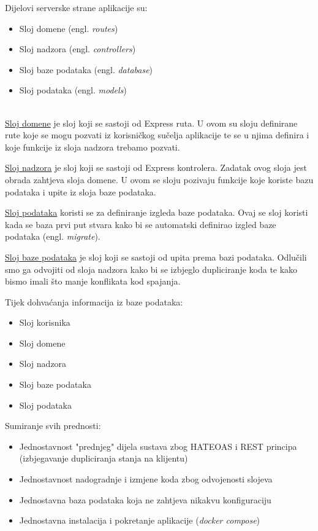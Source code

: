 Dijelovi serverske strane aplikacije su:
\begin{itemize}
  \item Sloj domene (engl. \textit{routes})
  \item Sloj nadzora (engl. \textit{controllers})
  \item Sloj baze podataka (engl. \textit{database})
  \item Sloj podataka (engl. \textit{models})
\end{itemize}
\hfill
\\

\underline{Sloj domene} je sloj koji se sastoji od Express ruta. U ovom su sloju definirane rute koje se mogu pozvati iz korisničkog sučelja aplikacije te se u njima definira i koje funkcije iz sloja nadzora trebamo pozvati.\hfill \break

\underline{Sloj nadzora} je sloj koji se sastoji od Express kontrolera. Zadatak  ovog sloja jest obrada zahtjeva sloja domene. U ovom se sloju pozivaju funkcije koje koriste bazu podataka i upite iz sloja baze podataka.\hfill \break

\underline{Sloj podataka} koristi se za definiranje izgleda baze podataka. Ovaj se sloj koristi kada se baza prvi put stvara kako bi se automatski definirao izgled baze podataka (engl. \textit{migrate}).\hfill \break

\underline{Sloj baze podataka} je sloj koji se sastoji od upita prema bazi podataka. Odlučili smo ga odvojiti od sloja nadzora kako bi se izbjeglo dupliciranje koda te kako bismo imali što manje konflikata kod spajanja.\hfill \eject


Tijek dohvaćanja informacija iz baze podataka:
\begin{itemize}
	\item Sloj korisnika
	\item Sloj domene
	\item Sloj nadzora
	\item Sloj baze podataka
	\item Sloj podataka
  \end{itemize}

Sumiranje svih prednosti:
\begin{itemize}
  \item Jednostavnost "prednjeg" dijela sustava zbog HATEOAS i REST \newline principa (izbjegavanje dupliciranja stanja na klijentu)
  \item Jednostavnost nadogradnje i izmjene koda zbog odvojenosti slojeva
  \item Jednostavna baza podataka koja ne zahtjeva nikakvu konfiguraciju
  \item Jednostavna instalacija i pokretanje aplikacije (\textit{docker compose})
\end{itemize}

